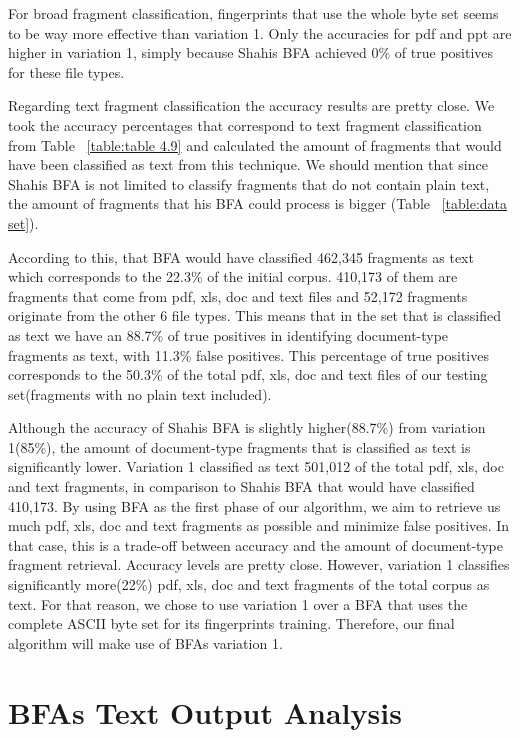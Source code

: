 
  
 For broad fragment classification, fingerprints that use the whole byte set seems to be way more effective than variation 1. Only the accuracies for pdf and ppt are higher in variation 1, simply because Shahis BFA achieved 0\% of true positives for these file types.
 
Regarding text fragment classification the accuracy results are pretty close. We took the accuracy percentages that correspond to text fragment classification from Table ~\ref{table:table 4.9} and calculated the amount of fragments that would have been classified as text from this technique. We should mention that since Shahis BFA is not limited to classify fragments that do not contain plain text, the amount of fragments that his BFA could process is bigger (Table ~\ref{table:data set}).

 According to this, that BFA would have classified 462,345 fragments as text which corresponds to the 22.3\% of the initial corpus. 410,173 of them are fragments that come from pdf, xls, doc and text files and 52,172 fragments originate from the other 6 file types. This means that in the set that is classified as text we have an 88.7\% of true positives in identifying document-type fragments as text, with 11.3\% false positives. This percentage of true positives corresponds to the 50.3\% of the total pdf, xls, doc and text files of our testing set(fragments with no plain text included).
 
Although the accuracy of Shahis BFA is slightly higher(88.7\%) from variation 1(85\%), the amount of document-type fragments that is classified as text is significantly lower. Variation 1 classified as text 501,012 of the total pdf, xls, doc and text fragments, in comparison to Shahis BFA that would have classified 410,173. By using BFA as the first phase of our algorithm, we aim to retrieve us much pdf, xls, doc and text fragments as possible and minimize false positives. In that case, this is a trade-off between accuracy and the amount of document-type fragment retrieval. Accuracy levels are pretty close. However, variation 1 classifies significantly more(22\%) pdf, xls, doc and text fragments of the total corpus as text. For that reason, we chose to use variation 1 over a BFA that uses the complete ASCII byte set for its fingerprints training. Therefore, our final algorithm will make use of BFAs variation 1.
 \pagebreak
\section{BFAs Text Output Analysis} 

